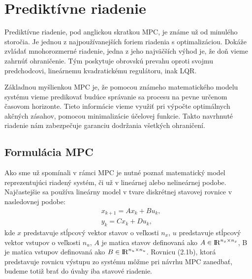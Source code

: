 \section{Prediktívne riadenie}
\label{se:teoriaMPC}

Prediktívne riadenie, pod anglickou skratkou MPC, je známe už od minulého storočia. Je jednou z najpoužívanejších foriem riadenia s optimalizáciou. Dokáže zvládať mnohorozmerné riadenie, jedna z jeho najväčších výhod je, že doň vieme zahrnúť ohraničenie. Tým poskytuje obrovskú prevahu oproti svojmu predchodcovi, lineárnemu kvadratickému regulátoru, inak LQR. 

Základnou myšlienkou MPC je, že pomocou známeho matematického modelu systému vieme predikovať budúce správanie sa procesu na pevne určenom časovom horizonte. Tieto informácie vieme využiť pri výpočte optimálnych akčných zásahov, pomocou minimalizácie účelovej funkcie. Takto navrhnuté riadenie nám zabezpečuje garanciu dodržania všetkých ohraničení.

\subsection{Formulácia MPC}
\label{subse:MPC}
Ako sme už spomínali v rámci MPC je nutné poznať matematický model reprezentujúci riadený systém, či už v lineárnej alebo nelineárnej podobe. Najčastejšie sa používa lineárny model v tvare diskrétnej stavovej rovnice v nasledovnej podobe:
\begin{subequations}
	\begin{align}
		&x_{k+1} = Ax_{k} + Bu_{k},\\
		&y_{k} = Cx_{k} + Du_{k},
	\end{align}
\end{subequations}
kde $x$ predstavuje stĺpcový vektor stavov o veľkosti $n_{x}$, $u$ predstavuje stĺpcový vektor vstupov o veľkosti $n_{u}$, $A$ je matica stavov definovaná ako $A \in {\rm I\!R}^{n_{x}\times n_{x}}$, B je matica vstupov definovaná ako $B \in {\rm I\!R}^{n_{u}\times n_{u}}$. Rovnicu (2.1b), ktorá predstavuje rovnicu výstupu zo systému môžme pri návrhu MPC zanedbať, budeme totiž brať do úvahy iba stavové riadenie.

